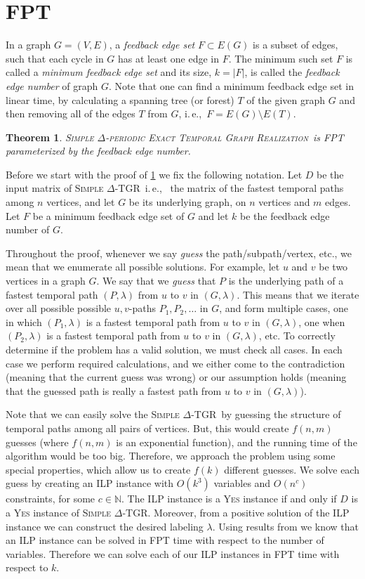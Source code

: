 \documentclass[11pt,a4paper]{article}
\newtheorem{theorem}{Theorem}
\theoremstyle{remark}
\theoremstyle{definition}
\newcommand{\ie}{i.\,e.,\ }
\newcommand{\deltaExactLong}{\textsc{Simple $\Delta$-periodic Exact Temporal Graph Realization}}
\newcommand{\deltaExact}{\textsc{Simple $\Delta$-TGR}}
\begin{document}
\section{FPT}
In a graph $G=(V,E)$, a \emph{feedback edge set} $F \subset E(G)$ is a subset of edges, such that each cycle in $G$ has at least one edge in $F$.
The minimum such set $F$ is called a  \emph{minimum feedback edge set} and its size, $k = |F|$, is called the \emph{feedback edge number} of graph $G$.
Note that one can find a minimum feedback edge set in linear time, by calculating a spanning tree (or forest) $T$ of the given graph $G$ and then removing all of the edges $T$ from $G$, \ie $F = E(G) \setminus E(T)$.

\begin{theorem}\label{thm:FPTwrtFES}
    \deltaExactLong\ is FPT parameterized by the feedback edge number.
\end{theorem}

Before we start with the proof of \cref{thm:FPTwrtFES} we fix the following notation. 
Let $D$ be the input matrix of \deltaExact\ \ie
the matrix of the fastest temporal paths among $n$ vertices, and let $G$ be its underlying graph, on $n$ vertices and $m$ edges.
Let $F$ be a minimum feedback edge set of $G$ and let $k$ be the feedback edge number of $G$.

Throughout the proof, whenever we say \emph{guess} the path/subpath/vertex, etc., we mean that we enumerate all possible solutions.
For example, let $u$ and $v$ be two vertices in a graph $G$. 
We say that we \emph{guess} that $P$ is the underlying path of a fastest temporal path $(P, \lambda)$ from $u$ to $v$ in $(G, \lambda)$.
This means that we iterate over all possible possible $u,v$-paths $P_1, P_2, \dots $ in $G$, 
and form multiple cases, 
one in which $(P_1, \lambda)$ is a fastest temporal path from $u$ to $v$ in $(G,\lambda)$,
one when $(P_2, \lambda)$ is a fastest temporal path from $u$ to $v$ in $(G,\lambda)$, etc.
To correctly determine if the problem has a valid solution, we must check all cases.
In each case we perform required calculations, 
and we either come to the contradiction (meaning that the current guess was wrong) 
or our assumption holds (meaning that the guessed path is really a fastest path from $u$ to $v$ in $(G, \lambda)$).

Note that we can easily solve the \deltaExact\ by guessing the structure of temporal paths among all pairs of vertices.
But, this would create $f(n,m)$ guesses (where $f(n,m)$ is an exponential function), and the running time of the algorithm would be too big.
Therefore, we approach the problem using some special properties, which allow us to create $f(k)$ different guesses.
We solve each guess by creating an ILP instance with $O(k^3)$ variables and $O(n^c)$ constraints, for some $c \in \mathbb{N}$.
The ILP instance is a \textsc{Yes} instance if and only if $D$ is a \textsc{Yes} instance of \deltaExact.
Moreover, from a positive solution of the ILP instance we can construct the desired labeling $\lambda$.
Using results from \cite{Lenstra1983Integer} we know that an ILP instance can be solved in FPT time with respect to the number of variables.
Therefore we can solve each of our ILP instances in FPT time with respect to $k$.
\end{document}
